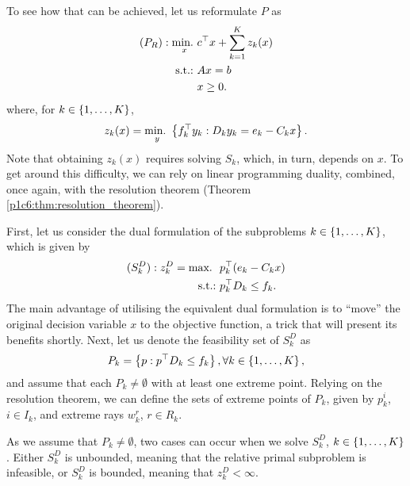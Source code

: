 To see how that can be achieved, let us reformulate $P$ as 
%
\begin{align*}
	(P_R) : \mathop{\text{min.~}}_x & c^\top x + \sum_{k=1}^K z_k(x) \\
	\mathop{\text{s.t.:~}}   & Ax = b \\
	      & x \geq 0.
\end{align*}
%
where, for $k \in \left\{ 1,\dots, K \right \}$,  
%
\begin{equation*}
	z_k(x) = \mathop{\text{min.~}}_y \left\{ f_k^\top y_k : D_ky_k = e_k - C_k x \right \}.	
\end{equation*}
%
Note that obtaining $z_k(x)$ requires solving $S_k$, which, in turn, depends on $x$. To get around this difficulty, we can rely on linear programming duality, combined, once again, with the resolution theorem (Theorem \ref{p1c6:thm:resolution_theorem}).

First, let us consider the dual formulation of the subproblems $k \in \left\{ 1,\dots, K \right \}$, which is given by
%
\begin{align*}
	(S^D_k) : z^D_k = \mathop{\text{max.~}} \ & p_k^\top (e_k - C_k x) \\
	\mathop{\text{s.t.:~}}   & p_k^\top D_k \leq f_k.	 
\end{align*}
%
The main advantage of utilising the equivalent dual formulation is to ``move'' the original decision variable $x$ to the objective function, a trick that will present its benefits shortly. Next, let us denote the feasibility set of $S^D_k$ as 
%
\begin{equation}
	P_k =\left\{ p : p^\top D_k \leq f_k \right \}, \forall k \in \left\{ 1,\dots,K \right \}, 
\end{equation}
%
and assume that each $P_k \neq \emptyset$ with at least one extreme point. Relying on the resolution theorem, we can define the sets of extreme points of $P_k$, given by $p_k^i$, $i \in I_k$, and extreme rays $w^r_k$, $r \in R_k$.

As we assume that $P_k \neq \emptyset$, two cases can occur when we solve $S^D_k$, $k \in \left\{ 1,\dots, K \right \}$. Either $S^D_k$ is unbounded, meaning that the relative primal subproblem is infeasible, or $S^D_k$ is bounded, meaning that $z^D_k < \infty$.


